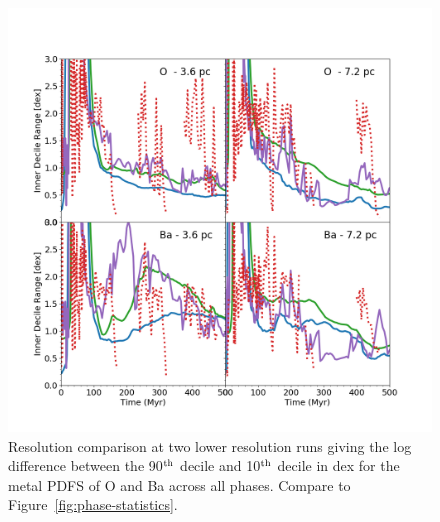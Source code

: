 \documentclass[twocolumn]{aastex61}
\begin{document}
\begin{figure}
\centering
\includegraphics[width=0.95\linewidth]{O_Ba_resolution_study.png}
\caption{Resolution comparison at two lower resolution runs giving the log difference between the 90$^{\rm th}$ decile and 10$^{\rm th}$ decile in dex for the metal PDFS of O and Ba across all phases. Compare to Figure~\ref{fig:phase-statistics}.}
\label{fig:resolution-phase}
\end{figure}
\end{document}
